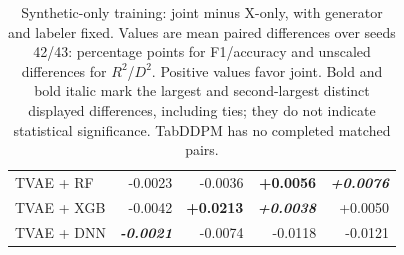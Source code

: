 \begin{table}[!t]
\begin{tabular}{@{}lrrrr@{}}
TVAE + RF & -0.0023 & -0.0036 & \textbf{+0.0056} & \textbf{\textit{+0.0076}} \\
TVAE + XGB & -0.0042 & \textbf{+0.0213} & \textbf{\textit{+0.0038}} & +0.0050 \\
TVAE + DNN & \textbf{\textit{-0.0021}} & -0.0074 & -0.0118 & -0.0121 \\
\bottomrule
\end{tabular}
\caption{Synthetic-only training: joint minus X-only, with generator and labeler fixed. Values are mean paired differences over seeds 42/43: percentage points for F1/accuracy and unscaled differences for $R^2$/$D^2$. Positive values favor joint. Bold and bold italic mark the largest and second-largest distinct displayed differences, including ties; they do not indicate statistical significance. TabDDPM has no completed matched pairs.}
\label{tab:joint-vs-xonly}
\end{table}
